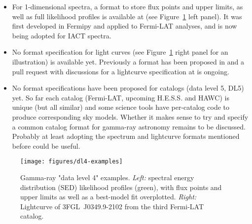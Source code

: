 \begin{itemize}
\item{} For 1-dimensional spectra, a format to store flux points and upper limits, as well as full likelihood profiles is available at \gadf (see Figure~\ref{fig:dl4-examples} left panel). It was first developed in Fermipy and applied to Fermi-LAT analyses, and is now being adopted for IACT spectra.
\item{} No format specification for light curves (see Figure~\ref{fig:dl4-examples} right panel for an illustration) is available yet. Previously a format has been proposed in \cite{2010AnA...524A..48T} and a pull request with discussions for a lightcurve specification at \gadf is ongoing.
\item{} No format specifications have been proposed for catalogs (data level 5, DL5) yet. So far each catalog (Fermi-LAT, upcoming H.E.S.S. and HAWC) is unique (but all similar) and some science tools have per-catalog code to produce corresponding sky models. Whether it makes sense to try and specify a common catalog format for gamma-ray astronomy remains to be discussed. Probably at least adopting the spectrum and lightcurve formats mentioned before could be useful.
\end{itemize}

\begin{figure}[tb]
\centerline{\texttt{[image: figures/dl4-examples]}}
\caption{
Gamma-ray "data level 4" examples. \emph{Left:} spectral energy distribution (SED) likelihood profiles (green), with flux points and upper limits as well
as a best-model fit overplotted. \emph{Right:} Lightcurve of 3FGL~J0349.9-2102 from the third Fermi-LAT catalog.
}
\label{fig:dl4-examples}
\end{figure}
